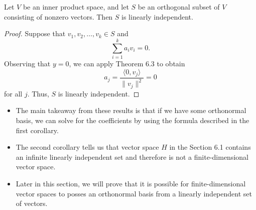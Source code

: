 \begin{corollary}\label{Corollary 2 to Theorem 6.3}
    Let \( V  \) be an inner product space, and let \( S  \) be an orthogonal subset of \( V  \) consisting of nonzero vectors. Then \( S  \) is linearly independent.
\end{corollary}

\begin{proof}
Suppose that \( {v}_{1}, {v}_{2}, \dots, {v}_{k} \in S  \) and 
\[  \sum_{ i=1  }^{ k  } {a}_{i} {v}_{i} = 0.  \]
Observing that \( y = 0  \), we can apply Theorem 6.3 to obtain
\[  {a}_{j} = \frac{ \langle 0 , {v}_{j} \rangle }{  \|{v}_{j}\|^{2} }  = 0\]
for all \( j  \). Thus, \( S  \) is linearly independent.
\end{proof} 

\begin{itemize}
    \item The main takeaway from these results is that if we have some orthonormal basis, we can solve for the coefficients by using the formula described in the first corollary.
    \item The second corollary tells us that vector space \( H  \) in the Section 6.1 contains an infinite linearly independent set and therefore is not a finite-dimensional vector space.
    \item Later in this section, we will prove that it is possible for finite-dimensional vector spaces to posses an orthonormal basis from a linearly independent set of vectors.
\end{itemize}

